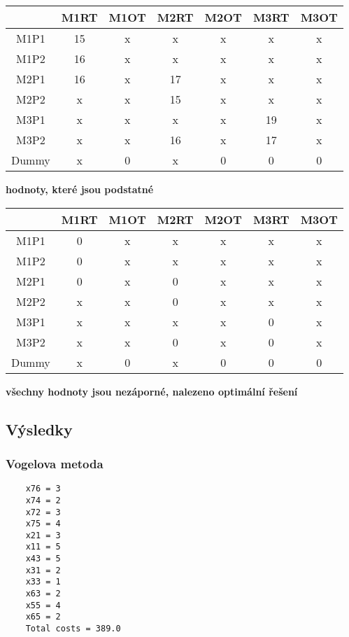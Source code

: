 \documentclass{article}%
\begin{document}
\begin{tabular}{c|cccccc}
    & M1RT & M1OT & M2RT & M2OT & M3RT & M3OT \\
    \midrule
    M1P1  & 15   & x    & x    & x    & x    & x    \\
    M1P2  & 16   & x    & x    & x    & x    & x    \\
    M2P1  & 16   & x    & 17   & x    & x    & x    \\
    M2P2  & x    & x    & 15   & x    & x    & x    \\
    M3P1  & x    & x    & x    & x    & 19   & x    \\
    M3P2  & x    & x    & 16   & x    & 17   & x    \\
    Dummy & x    & 0    & x    & 0    & 0    & 0   
\end{tabular}
\newline
\textbf{
    hodnoty, které jsou podstatné \\
}
\newline
\newline

\begin{tabular}{c|cccccc}
    & M1RT & M1OT & M2RT & M2OT & M3RT & M3OT \\
    \midrule
    M1P1  & 0    & x    & x    & x    & x    & x    \\
    M1P2  & 0    & x    & x    & x    & x    & x    \\
    M2P1  & 0    & x    & 0    & x    & x    & x    \\
    M2P2  & x    & x    & 0    & x    & x    & x    \\
    M3P1  & x    & x    & x    & x    & 0    & x    \\
    M3P2  & x    & x    & 0    & x    & 0    & x    \\
    Dummy & x    & 0    & x    & 0    & 0    & 0   
\end{tabular}
\newline
\textbf{
    všechny hodnoty jsou nezáporné, nalezeno optimální řešení \\
}
\newline

\newpage
\subsection{Výsledky}
\subsubsection{Vogelova metoda}
\begin{lstlisting}
    x76 = 3
    x74 = 2
    x72 = 3
    x75 = 4
    x21 = 3
    x11 = 5
    x43 = 5
    x31 = 2
    x33 = 1
    x63 = 2
    x55 = 4
    x65 = 2
    Total costs = 389.0
\end{lstlisting}
\end{document}
